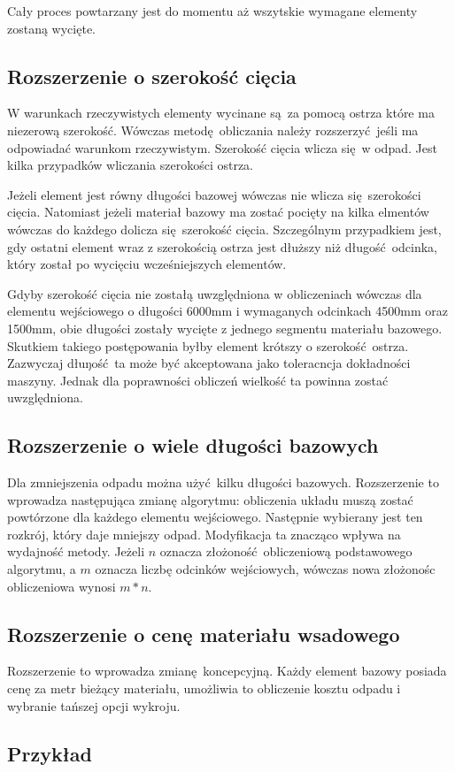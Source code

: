 Cały proces powtarzany jest do momentu aż wszytskie wymagane elementy zostaną wycięte.

\subsection{Rozszerzenie o szerokość cięcia}
W warunkach rzeczywistych elementy wycinane są za pomocą ostrza które ma niezerową szerokość. Wówczas metodę obliczania należy rozszerzyć jeśli ma odpowiadać warunkom rzeczywistym. Szerokość cięcia wlicza się w odpad. Jest kilka przypadków wliczania szerokości ostrza.

Jeżeli element jest równy długości bazowej wówczas nie wlicza się szerokości cięcia. Natomiast jeżeli materiał bazowy ma zostać pocięty na kilka elmentów wówczas do każdego dolicza się szerokość cięcia. Szczególnym przypadkiem jest, gdy ostatni element wraz z szerokością ostrza jest dłuższy niż długość odcinka, który został po wycięciu wcześniejszych elementów.

Gdyby szerokość cięcia nie zostałą uwzględniona w obliczeniach wówczas dla elementu wejściowego o długości 6000mm i wymaganych odcinkach 4500mm oraz 1500mm, obie długości zostały wycięte z jednego segmentu materiału bazowego. Skutkiem takiego postępowania byłby element krótszy o szerokość ostrza. Zazwyczaj dłuŋość ta może być akceptowana jako toleracncja dokładności maszyny. Jednak dla poprawności obliczeń wielkość ta powinna zostać uwzględniona.

\subsection{Rozszerzenie o wiele długości bazowych}
Dla zmniejszenia odpadu można użyć kilku długości bazowych. Rozszerzenie to wprowadza następująca zmianę algorytmu: obliczenia układu muszą zostać powtórzone dla każdego elementu wejściowego. Następnie wybierany jest ten rozkrój, który daje mniejszy odpad. Modyfikacja ta znacząco wpływa na wydajność metody. Jeżeli $n$ oznacza złożoność obliczeniową podstawowego algorytmu, a $m$ oznacza liczbę odcinków wejściowych, wówczas nowa złożonośc obliczeniowa wynosi $m*n$.

\subsection{Rozszerzenie o cenę materiału wsadowego}
Rozszerzenie to wprowadza zmianę koncepcyjną. Każdy element bazowy posiada cenę za metr bieżący materiału, umożliwia to obliczenie kosztu odpadu i wybranie tańszej opcji wykroju.

\subsection{Przykład}
